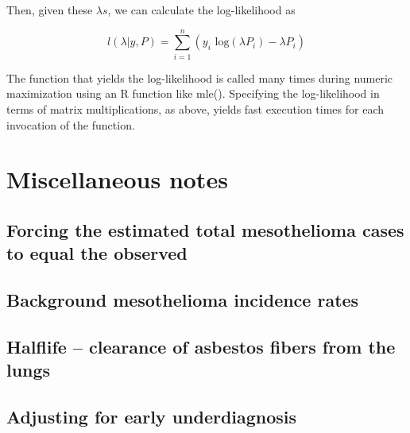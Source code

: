 \documentclass[paper=letter,listof=leveldown,appendixprefix=true]{scrreprt}\usepackage{graphicx, color}
\begin{document}
Then, given these $\lambda s$, we can calculate the log-likelihood as

\begin{equation*}
l(\lambda|y,P) = \sum\limits_{i=1}^n (y_i \text{ log}(\lambda P_i) - \lambda P_i)
\end{equation*}

The function that yields the log-likelihood is called many times during numeric maximization using an R function like mle().  Specifying the log-likelihood in terms of matrix multiplications, as above, yields fast execution times for each invocation of the function.

\chapter{Miscellaneous notes}

\section{Forcing the estimated total mesothelioma cases to equal the observed}
\section{Background mesothelioma incidence rates}
\section{Halflife -- clearance of asbestos fibers from the lungs}
\section{Adjusting for early underdiagnosis}
\end{document}
